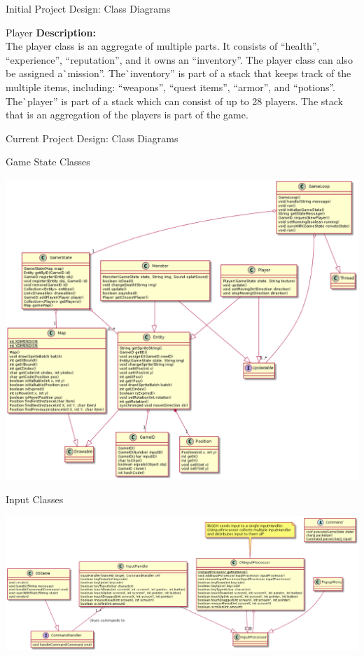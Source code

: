 \documentclass[12pt]{report}
\begin{document}
\begin{chapter}{Initial Project Design: Class Diagrams}
\begin{section}{Player}
     \noindent\textbf{Description:}\\
     The player class is an aggregate of multiple parts. It consists of ``health'', ``experience'', ``reputation'', and it owns an ``inventory''. The player class can also be assigned a\`{ }mission''. The\`{ }inventory'' is part of a stack that keeps track of the multiple items, including: ``weapons'', ``quest items'', ``armor'', and ``potions''. The\`{ }player'' is part of a stack which can consist of up to 28 players. The stack that is an aggregation of the players is part of the game.
  \end{section}
 
 \end{chapter}
 \begin{chapter}{Current Project Design: Class Diagrams}
   \begin{section}{Game State Classes}
   	\centerline{\includegraphics[width=\textwidth,height=\textheight,keepaspectratio]{./images/gameStateClasses.png}}
   \end{section}
   \begin{section}{Input Classes}
   	\centerline{\includegraphics[width=\textwidth,height=\textheight,keepaspectratio]{./images/inputClasses.png}}

\end{section}
\end{chapter}
\end{document}
